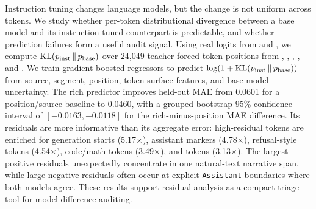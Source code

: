 Instruction tuning changes language models, but the change is not uniform across tokens. We study whether per-token distributional divergence between a base model and its instruction-tuned counterpart is predictable, and whether prediction failures form a useful audit signal. Using real logits from \qwenbase and \qweninstruct, we compute $\mathrm{KL}\!\left(p_{\mathrm{inst}}\,\Vert\,p_{\mathrm{base}}\right)$ over 24,049 teacher-forced token positions from \alpaca, \justeval, \beavertails, \arena, and \wikitext. We train gradient-boosted regressors to predict $\log(1+\mathrm{KL}\!\left(p_{\mathrm{inst}}\,\Vert\,p_{\mathrm{base}}\right))$ from source, segment, position, token-surface features, and base-model uncertainty. The rich predictor improves held-out MAE from 0.0601 for a position/source baseline to 0.0460, with a grouped bootstrap 95\% confidence interval of $[-0.0163,-0.0118]$ for the rich-minus-position MAE difference. Its residuals are more informative than its aggregate error: high-residual tokens are enriched for generation starts (5.17$\times$), assistant markers (4.78$\times$), refusal-style tokens (4.54$\times$), code/math tokens (3.49$\times$), and \wikitext tokens (3.13$\times$). The largest positive residuals unexpectedly concentrate in one natural-text narrative span, while large negative residuals often occur at explicit \texttt{Assistant} boundaries where both models agree. These results support residual analysis as a compact triage tool for model-difference auditing.
